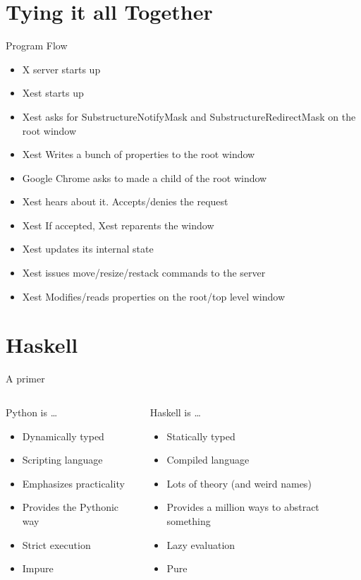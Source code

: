 \documentclass[10pt]{beamer}
\begin{document}
\section{Tying it all Together}
\begin{frame}{Program Flow}
  \begin{itemize}
    \item X server starts up
    \item Xest starts up
    \item Xest asks for SubstructureNotifyMask and SubstructureRedirectMask on
      the root window
    \item Xest Writes a bunch of properties to the root window
    \item Google Chrome asks to made a child of the root window
    \item Xest hears about it. Accepts/denies the request
    \item Xest If accepted, Xest reparents the window
    \item Xest updates its internal state
    \item Xest issues move/resize/restack commands to the server
    \item Xest Modifies/reads properties on the root/top level window
  \end{itemize}
\end{frame}

\section{Haskell}
\begin{frame}{A primer}
  \begin{columns}[T]
    \begin{column}{.48\textwidth}
      Python is \ldots
      \begin{itemize}
        \item Dynamically typed
        \item Scripting language
        \item Emphasizes practicality
        \item Provides the Pythonic way
        \item Strict execution
        \item Impure
      \end{itemize}
    \end{column}
    \begin{column}{.48\textwidth}
      Haskell is \ldots
      \begin{itemize}
        \item Statically typed
        \item Compiled language
        \item Lots of theory (and weird names)
        \item Provides a million ways to abstract something
        \item Lazy evaluation
        \item Pure
      \end{itemize}
    \end{column}
  \end{columns}
\end{frame}
\end{document}
